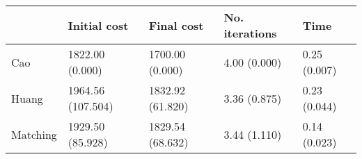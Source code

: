 \begin{tabular}{lllll}
\toprule
{} &       Initial cost &        Final cost & No. iterations &          Time \\
\midrule
Cao      &    1822.00 (0.000) &   1700.00 (0.000) &   4.00 (0.000) &  0.25 (0.007) \\
Huang    &  1964.56 (107.504) &  1832.92 (61.820) &   3.36 (0.875) &  0.23 (0.044) \\
Matching &   1929.50 (85.928) &  1829.54 (68.632) &   3.44 (1.110) &  0.14 (0.023) \\
\bottomrule
\end{tabular}
